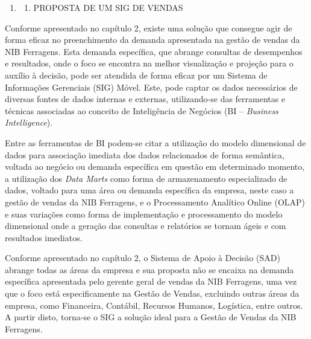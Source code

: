 \documentclass[a4paper]{article}
\newcommand\liststyleWWviiiNumi{%
\renewcommand\theenumi{\arabic{enumi}}
\renewcommand\theenumii{\arabic{enumi}.\arabic{enumii}}
\renewcommand\theenumiii{\arabic{enumi}.\arabic{enumii}.\arabic{enumiii}}
\renewcommand\theenumiv{\arabic{enumi}.\arabic{enumii}.\arabic{enumiii}.\arabic{enumiv}}
\renewcommand\labelenumi{\theenumi}
\renewcommand\labelenumii{\theenumii}
\renewcommand\labelenumiii{\theenumiii}
\renewcommand\labelenumiv{\theenumiv.}
}
\begin{document}
\liststyleWWviiiNumi
\begin{enumerate}
\item \begin{enumerate}
\item {\sffamily
PROPOSTA DE UM SIG DE VENDAS}
\end{enumerate}
\end{enumerate}
{
\textsf{Conforme apresentado no cap\'itulo 2, existe uma solu\c{c}\~ao que consegue agir de forma eficaz no
preenchimento da demanda apresentada na gest\~ao de vendas da NIB Ferragens. Esta demanda espec\'ifica, que abrange
consultas de desempenhos e resultados, onde o foco se encontra na melhor visualiza\c{c}\~ao e proje\c{c}\~ao para o
aux\'ilio \`a decis\~ao, pode ser atendida de forma eficaz por um Sistema de Informa\c{c}\~oes Gerenciais (SIG)
M\'ovel. Este, pode captar os dados necess\'arios de diversas fontes de dados internas e externas, utilizando-se das
ferramentas e t\'ecnicas associadas ao conceito de Intelig\^encia de Neg\'ocios (BI -- }\textsf{\textit{Business
Intelligence}}\textsf{).}}

{
\textsf{Entre as ferramentas de BI podem-se citar a utiliza\c{c}\~ao do modelo dimensional de dados para
associa\c{c}\~ao imediata dos dados relacionados de forma sem\^antica, voltada ao neg\'ocio ou demanda espec\'ifica em
quest\~ao em determinado momento, a utiliza\c{c}\~ao dos }\textsf{\textit{Data Marts}}\textsf{ como forma de
armazenamento especializado de dados, voltado para uma \'area ou demanda espec\'ifica da empresa, neste caso a gest\~ao
de vendas da NIB Ferragens, e o Processamento Anal\'itico Online (OLAP) e suas varia\c{c}\~oes como forma de
implementa\c{c}\~ao e processamento do modelo dimensional }\textsf{onde a gera\c{c}\~ao das consultas e relat\'orios se
tornam \'ageis e com resultados imediatos.}}

{
\textsf{Conforme apresentado no cap\'itulo 2, o Sistema de Apoio \`a Decis\~ao (SAD) abrange todas as \'areas da empresa
e sua proposta n\~ao se encaixa na demanda espec\'ifica apresentada pelo gerente geral de vendas da NIB Ferragens, uma
vez que o foco est\'a especificamente na Gest\~ao de Vendas, excluindo outras \'areas da empresa, como Financeira,
Cont\'abil, Recursos Humanos, Log\'istica, entre outros. A partir disto, torna-se o SIG a solu\c{c}\~ao ideal para a
Gest\~ao de Vendas da NIB Ferragens.}}
\end{document}
